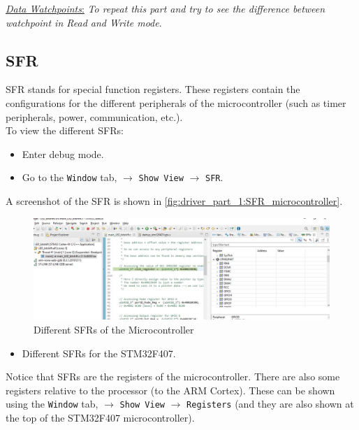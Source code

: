  \underline{\textit{Data Watchpoints}:} \textit{To repeat this part and try to see the difference between watchpoint in Read and Write mode}.


\subsection{SFR}

SFR stands for special function registers. These registers contain the configurations for the different peripherals of the microcontroller (such as timer peripherals, power, communication, etc.).\\

To view the different SFRs:

\begin{itemize}
    \item Enter debug mode.

    \item Go to the \verb|Window| tab, $\rightarrow$ \verb|Show View| $\rightarrow$ \verb|SFR|.
\end{itemize}

A screenshot of the SFR is shown in \autoref{fig:driver_part_1:SFR_microcontroller}.

\begin{figure}[h]
\centering
\includegraphics[scale=0.5]{Figures/driver_part_1/SFR_microcontroller}
\caption{Different SFRs of the Microcontroller}
\label{fig:driver_part_1:SFR_microcontroller}
\end{figure} 

\begin{itemize}
    \item Different SFRs for the STM32F407.
\end{itemize}

Notice that SFRs are the registers of the microcontroller. There are also some registers relative to the processor (to the ARM Cortex). These can be shown using the \verb|Window| tab, $\rightarrow$ \verb|Show View| $\rightarrow$ \verb|Registers| (and they are also shown at the top of the STM32F407 microcontroller).\\

